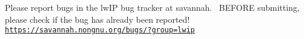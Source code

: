 Please report bugs in the lw\+IP bug tracker at savannah.~\newline
B\+E\+F\+O\+RE submitting, please check if the bug has already been reported!~\newline
\href{https://savannah.nongnu.org/bugs/?group=lwip}{\tt https\+://savannah.\+nongnu.\+org/bugs/?group=lwip} 